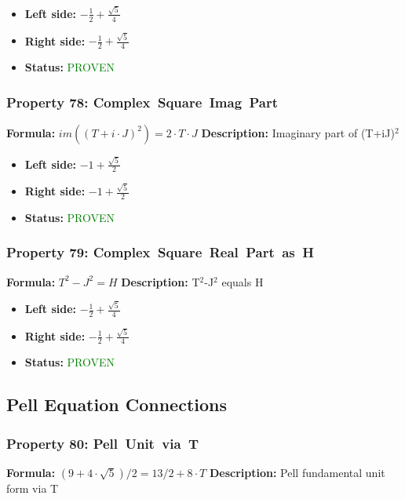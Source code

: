 \begin{itemize}
\item \textbf{Left side:} $- \frac{1}{2} + \frac{\sqrt{5}}{4}$
\item \textbf{Right side:} $- \frac{1}{2} + \frac{\sqrt{5}}{4}$
\item \textbf{Status:} \textcolor{green}{PROVEN}
\end{itemize}

\subsubsection*{Property 78: Complex~Square~Imag~Part}
\textbf{Formula:} $im((T+i \cdot J)^2) = 2 \cdot T \cdot J$
\textbf{Description:} Imaginary part of (T+iJ)$^2$

\begin{itemize}
\item \textbf{Left side:} $-1 + \frac{\sqrt{5}}{2}$
\item \textbf{Right side:} $-1 + \frac{\sqrt{5}}{2}$
\item \textbf{Status:} \textcolor{green}{PROVEN}
\end{itemize}

\subsubsection*{Property 79: Complex~Square~Real~Part~as~H}
\textbf{Formula:} $T^2-J^2 = H$
\textbf{Description:} T$^2$-J$^2$ equals H

\begin{itemize}
\item \textbf{Left side:} $- \frac{1}{2} + \frac{\sqrt{5}}{4}$
\item \textbf{Right side:} $- \frac{1}{2} + \frac{\sqrt{5}}{4}$
\item \textbf{Status:} \textcolor{green}{PROVEN}
\end{itemize}


\subsection{Pell Equation Connections}

\subsubsection*{Property 80: Pell~Unit~via~T}
\textbf{Formula:} $(9+4 \cdot \sqrt{5})/2 = 13/2 + 8 \cdot T$
\textbf{Description:} Pell fundamental unit form via T

